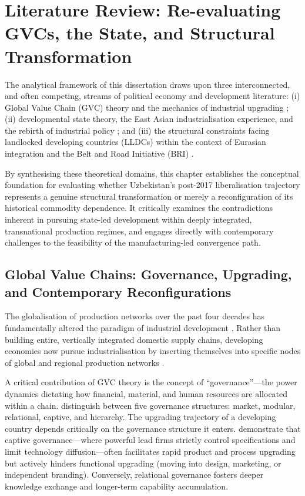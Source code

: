 \section{Literature Review: Re-evaluating GVCs, the State, and Structural Transformation}
\label{sec:literature_review}

The analytical framework of this dissertation draws upon three interconnected, and often competing, streams of political economy and development literature: (i) Global Value Chain (GVC) theory and the mechanics of industrial upgrading \citep{gereffi2005, milberg2013, humphrey2002, sturgeon2008}; (ii) developmental state theory, the East Asian industrialisation experience, and the rebirth of industrial policy \citep{amsden1989, wade1990, evans1995, chang2002}; and (iii) the structural constraints facing landlocked developing countries (LLDCs) within the context of Eurasian integration and the Belt and Road Initiative (BRI) \citep{limao2001, arvis2016, carrere2004}.

By synthesising these theoretical domains, this chapter establishes the conceptual foundation for evaluating whether Uzbekistan's post-2017 liberalisation trajectory represents a genuine structural transformation or merely a reconfiguration of its historical commodity dependence. It critically examines the contradictions inherent in pursuing state-led development within deeply integrated, transnational production regimes, and engages directly with contemporary challenges to the feasibility of the manufacturing-led convergence path.

\subsection{Global Value Chains: Governance, Upgrading, and Contemporary Reconfigurations}

The globalisation of production networks over the past four decades has fundamentally altered the paradigm of industrial development \citep{gereffi1994, sturgeon2008}. Rather than building entire, vertically integrated domestic supply chains, developing economies now pursue industrialisation by inserting themselves into specific nodes of global and regional production networks \citep{gereffi2005, milberg2013}.

A critical contribution of GVC theory is the concept of ``governance''---the power dynamics dictating how financial, material, and human resources are allocated within a chain. \citet{gereffi2005} distinguish between five governance structures: market, modular, relational, captive, and hierarchy. The upgrading trajectory of a developing country depends critically on the governance structure it enters. \citet{humphrey2002} demonstrate that captive governance---where powerful lead firms strictly control specifications and limit technology diffusion---often facilitates rapid product and process upgrading but actively hinders functional upgrading (moving into design, marketing, or independent branding). Conversely, relational governance fosters deeper knowledge exchange and longer-term capability accumulation.

